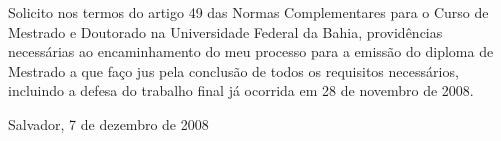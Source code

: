 \documentclass[12pt]{letter}
\begin{document}
\begin{letter}
\address{Ao\\ Prof. Dr. Ricardo Mazzini Bordini \\ MD. Coordenador do Programa de
  Pós-Graduação em Música da UFBA}
\signature{Marcos da Silva Sampaio}

\vspace{7em}
\thispagestyle{empty}

Solicito nos termos do artigo 49 das Normas Complementares para o
Curso de Mestrado e Doutorado na Universidade Federal da Bahia,
providências necessárias ao encaminhamento do meu processo para a
emissão do diploma de Mestrado a que faço jus pela conclusão de todos
os requisitos necessários, incluindo a defesa do trabalho final já
ocorrida em 28 de novembro de 2008.

\closing{Salvador, 7 de dezembro de 2008}

\end{letter}
\end{document}
